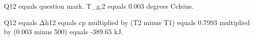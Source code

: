 Q12 equals question mark. T_g,2 equals 0.003 degrees Celsius.  

Q12 equals Δh12 equals cp multiplied by (T2 minus T1) equals 0.7993 multiplied by (0.003 minus 500) equals -389.65 kJ.